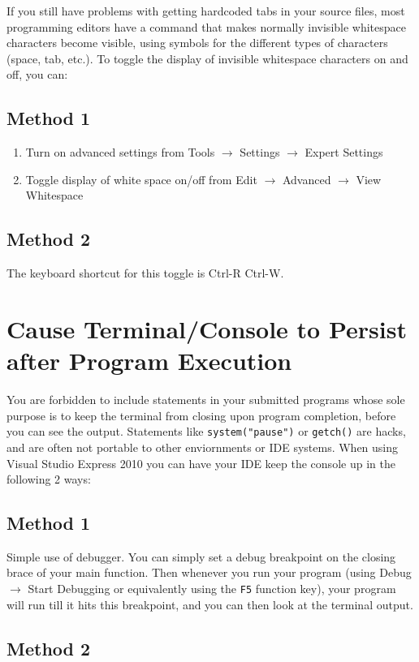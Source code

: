 \documentclass[11pt]{article}
\begin{document}
If you still have problems with getting hardcoded tabs in your source
files, most programming editors have a command that makes normally
invisible whitespace characters become visible, using symbols for the
different types of characters (space, tab, etc.).  To toggle the
display of invisible whitespace characters on and off, you can:
\subsection{Method 1}
\label{sec-3-1}

\begin{enumerate}
\item Turn on advanced settings from Tools $\rightarrow$ Settings $\rightarrow$ Expert Settings
\item Toggle display of white space on/off from Edit $\rightarrow$ Advanced $\rightarrow$ View Whitespace
\end{enumerate}
\subsection{Method 2}
\label{sec-3-2}

The keyboard shortcut for this toggle is Ctrl-R Ctrl-W.
\section{Cause Terminal/Console to Persist after Program Execution}
\label{sec-4}

You are forbidden to include statements in your submitted programs
whose sole purpose is to keep the terminal from closing upon program
completion, before you can see the output.  Statements like
\verb~system("pause")~ or \verb~getch()~ are hacks, and are often not portable
to other enviornments or IDE systems.  When using Visual Studio Express 2010
you can have your IDE keep the console up in the following 2 ways:
\subsection{Method 1}
\label{sec-4-1}

Simple use of debugger.  You can simply set a debug breakpoint on the
closing brace of your main function.  Then whenever you run your
program (using Debug $\rightarrow$ Start Debugging or equivalently
using the \verb~F5~ function key), your program will run till it hits this
breakpoint, and you can then look at the terminal output.
\subsection{Method 2}
\label{sec-4-2}
\end{document}
